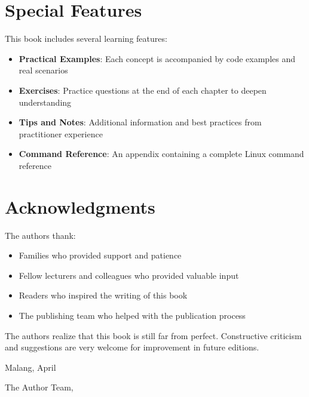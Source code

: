 \section*{Special Features}

This book includes several learning features:

\begin{itemize}
    \item \textbf{Practical Examples}: Each concept is accompanied by code examples and
          real scenarios
    \item \textbf{Exercises}: Practice questions at the end of each chapter to deepen
          understanding
    \item \textbf{Tips and Notes}: Additional information and best practices from
          practitioner experience
    \item \textbf{Command Reference}: An appendix containing a complete Linux command reference
\end{itemize}

\section*{Acknowledgments}

The authors thank:

\begin{itemize}
    \item Families who provided support and patience
    \item Fellow lecturers and colleagues who provided valuable input
    \item Readers who inspired the writing of this book
    \item The publishing team who helped with the publication process
\end{itemize}

The authors realize that this book is still far from perfect. Constructive criticism and suggestions are very welcome for improvement in future editions.

\vspace{1cm}

\noindent
Malang, April \the\year

\vspace{1cm}

\noindent
The Author Team,

\vspace{2cm}

\cleardoublepage
